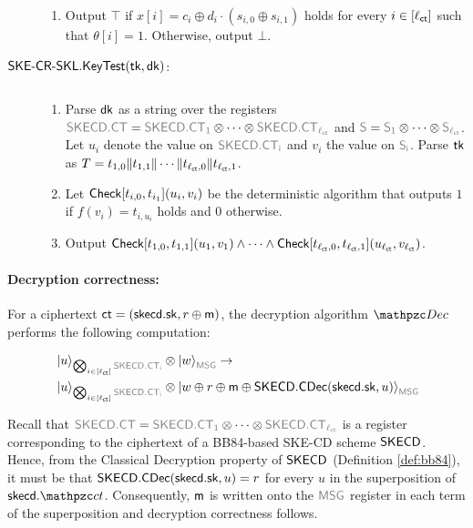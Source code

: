 \begin{description}
\begin{enumerate}
\item Output $\top$ if $x[i]=c_i \oplus d_i\cdot(s_{i,0}\oplus
        s_{i,1})$ holds for every $i\in[\ctlen]$ such that $\theta[i]=1$.
    Otherwise, output $\bot$.
\end{enumerate}

\item[$\SKECRSKL.\KeyTest(\tk,\dk)$:] $ $
\begin{enumerate}
\item Parse $\dk$ as a string over the registers
$\qreg{SKECD.CT} = \qreg{SKECD.CT_1} \otimes \cdots \otimes
\qreg{SKECD.CT_{\ctlen}}$ and $\qreg{S} = \qreg{S_1} \otimes
\cdots \otimes \qreg{S_{\ctlen}}$.
Let $u_i$ denote the value on
$\qreg{SKECD.CT_i}$ and $v_i$ the value on $\qreg{S_i}$. Parse $\tk$
as $T=t_{1,0}\|t_{1,1}\|\cdots \|t_{\ctlen,0}\|t_{\ctlen,1}$.


\item Let $\Check[t_{i,0},t_{i_1}](u_i,v_i)$ be the deterministic
algorithm that outputs $1$ if $f(v_i)=t_{i,u_i}$ holds and $0$
otherwise.

\item Output $\Check[t_{1,0},t_{1,1}](u_1,v_1) \land
\cdots \land
\Check[t_{\ctlen,0},t_{\ctlen,1}](u_{\ctlen},v_{\ctlen})$.
\end{enumerate}

\end{description}


\paragraph{Decryption correctness:} For a ciphertext $\ct =
(\skecd.\sk, r \xor \msg)$, the decryption algorithm $\qDec$ performs
the following computation:

\begin{align}
&\ket{u}_{\bigotimes_{i\in[\ctlen]}\qreg{SKECD.
CT_i}} \tensor\ket{w}_{\qreg{MSG}} \ra\\
&\ket{u}_{\bigotimes_{i\in[\ctlen]}\qreg{SKECD.CT_i}}\tensor\ket{w
\xor r \xor \msg \xor \SKECD.\CDec(\skecd.\sk, u)}_{\qreg{MSG}}
\end{align}

Recall that $\qreg{SKECD.CT} = \qreg{SKECD.CT_1} \otimes \cdots
\otimes \qreg{SKECD.CT_{\ctlen}}$ is a register corresponding to the
ciphertext of a BB84-based SKE-CD scheme $\SKECD$. Hence, from the Classical
Decryption property of $\SKECD$ (Definition \ref{def:bb84}), it must be that
$\SKECD.\CDec(\skecd.\sk, u) = r$ for every $u$ in the superposition
of $\skecd.\qct$. Consequently, $\msg$ is written onto the
$\qreg{MSG}$ register in each term of the superposition and decryption
correctness follows.


